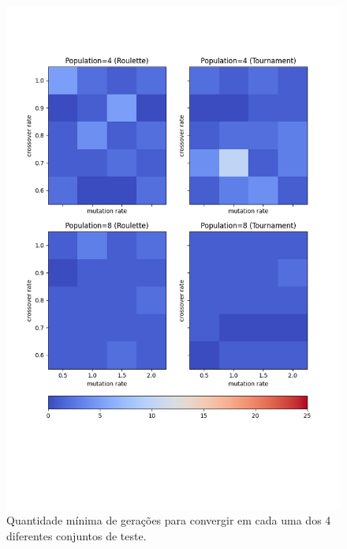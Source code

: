 \documentclass[12pt]{article}
\begin{document}
\begin{figure}
    \centering
    \includegraphics{fig/min_colors.png}
    \caption{Quantidade mínima de gerações para convergir em cada uma dos 4 diferentes conjuntos de teste.}
    \label{fig:min}
\end{figure}
\end{document}
